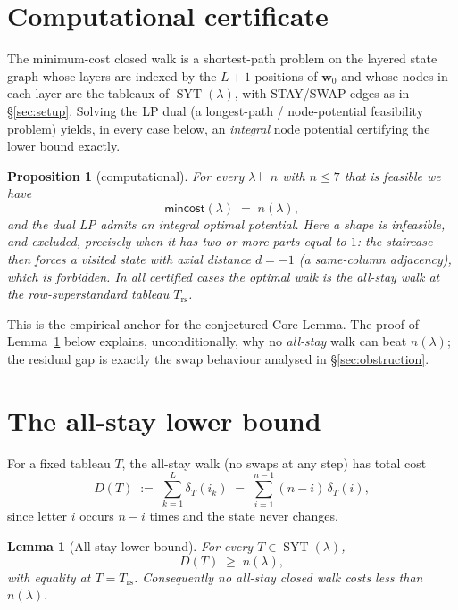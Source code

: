 \documentclass[11pt]{article}
\theoremstyle{plain}
\newtheorem{lemma}{Lemma}
\newtheorem{proposition}{Proposition}
\theoremstyle{remark}
\newcommand{\SYT}{\operatorname{SYT}}
\newcommand{\mincost}{\mathsf{mincost}}
\newcommand{\Trs}{T_{\mathrm{rs}}}
\begin{document}
\section{Computational certificate}\label{sec:cert}

The minimum-cost closed walk is a shortest-path problem on the layered
state graph whose layers are indexed by the $L+1$ positions of
$\mathbf{w}_0$ and whose nodes in each layer are the tableaux of
$\SYT(\lambda)$, with STAY/SWAP edges as in \S\ref{sec:setup}. Solving the
LP dual (a longest-path / node-potential feasibility problem) yields, in
every case below, an \emph{integral} node potential certifying the lower
bound exactly.

\begin{proposition}[computational]\label{prop:cert}
For every $\lambda\vdash n$ with $n\le 7$ that is \emph{feasible} we have
\[
  \mincost(\lambda)\;=\;n(\lambda),
\]
and the dual LP admits an integral optimal potential. Here a shape is
infeasible, and excluded, precisely when it has two or more parts equal to
$1$: the staircase then forces a visited state with axial distance $d=-1$
(a same-column adjacency), which is forbidden. In all certified cases the
optimal walk is the all-stay walk at the row-superstandard tableau $\Trs$.
\end{proposition}

This is the empirical anchor for the conjectured Core Lemma. The proof of
Lemma~\ref{lem:allstay} below explains, unconditionally, why no \emph{all-stay}
walk can beat $n(\lambda)$; the residual gap is exactly the swap behaviour
analysed in \S\ref{sec:obstruction}.

\section{The all-stay lower bound}\label{sec:allstay}

For a fixed tableau $T$, the all-stay walk (no swaps at any step) has total
cost
\[
  D(T)\;:=\;\sum_{k=1}^{L}\delta_T(i_k)\;=\;\sum_{i=1}^{n-1}(n-i)\,\delta_T(i),
\]
since letter $i$ occurs $n-i$ times and the state never changes.

\begin{lemma}[All-stay lower bound]\label{lem:allstay}
For every $T\in\SYT(\lambda)$,
\[
  D(T)\;\ge\;n(\lambda),
\]
with equality at $T=\Trs$. Consequently no all-stay closed walk costs less
than $n(\lambda)$.
\end{lemma}
\end{document}
